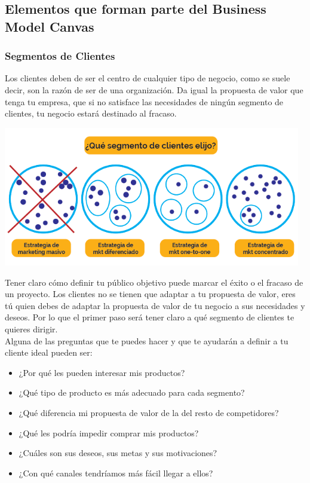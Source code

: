 \documentclass[preprint,12pt]{elsarticle}
\begin{document}
\subsection{Elementos que forman parte del Business Model Canvas}

\subsubsection{Segmentos de Clientes}
Los clientes deben de ser el centro de cualquier tipo de negocio, como se suele decir, son la razón de ser de una organización.
Da igual la propuesta de valor que tenga tu empresa, que si no satisface las necesidades de ningún segmento de clientes, tu negocio estará destinado al fracaso.	
	\begin{center}
	\includegraphics[width=13cm]{./Imagenes/canvas1}
	\end{center}
Tener claro cómo definir tu público objetivo puede marcar el éxito o el fracaso de un proyecto.
Los clientes no se tienen que adaptar a tu propuesta de valor, eres tú quien debes de adaptar la propuesta de valor de tu negocio a sus necesidades y deseos.
Por lo que el primer paso será tener claro a qué segmento de clientes te quieres dirigir.\\
Alguna de las preguntas que te puedes hacer y que te ayudarán a definir a tu cliente ideal pueden ser:\\
\begin{itemize}
\item ¿Por qué les pueden interesar mis productos?
\item ¿Qué tipo de producto es más adecuado para cada segmento?
\item ¿Qué diferencia mi propuesta de valor de la del resto de competidores?
\item ¿Qué les podría impedir comprar mis productos?
\item ¿Cuáles son sus deseos, sus metas y sus motivaciones?
\item ¿Con qué canales tendríamos más fácil llegar a ellos?
\end{itemize}
\end{document}
